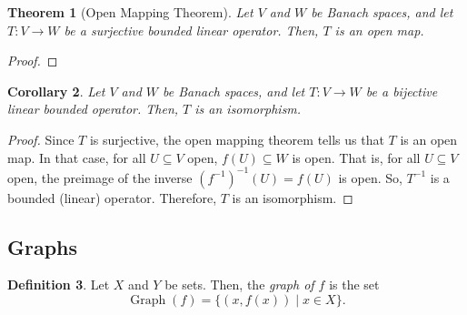 \documentclass[a4paper, openany]{memoir}
\theoremstyle{definition}
\newtheorem{definition}{Definition}[section]
\theoremstyle{plain}
\newtheorem{theorem}[definition]{Theorem}
\newtheorem{corollary}[definition]{Corollary}
\begin{document}
    \begin{theorem}[Open Mapping Theorem]
        Let $V$ and $W$ be Banach spaces, and let $T: V \to W$ be a surjective bounded linear operator. Then, $T$ is an open map.
    \end{theorem}
    \begin{proof}
    \end{proof}

    \begin{corollary}
        Let $V$ and $W$ be Banach spaces, and let $T: V \to W$ be a bijective linear bounded operator. Then, $T$ is an isomorphism.
    \end{corollary}
    \begin{proof}
        Since $T$ is surjective, the open mapping theorem tells us that $T$ is an open map. In that case, for all $U \subseteq V$ open, $f(U) \subseteq W$ is open. That is, for all $U \subseteq V$ open, the preimage of the inverse $(f^{-1})^{-1}(U) = f(U)$ is open. So, $T^{-1}$ is a bounded (linear) operator. Therefore, $T$ is an isomorphism.
    \end{proof}

    \subsection{Graphs}
    \begin{definition}
        Let $X$ and $Y$ be sets. Then, the \emph{graph of $f$} is the set
        \[\operatorname{Graph} (f) = \{(x, f(x)) \mid x \in X\}.\]
    \end{definition}
\end{document}
